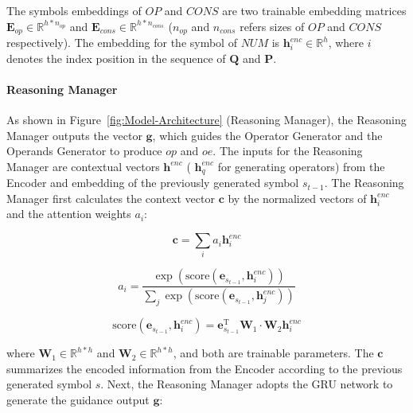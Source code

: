 \documentclass{article}
\begin{document}
The symbols embeddings of \(\textit{OP}\) and \(\textit{CONS}\) are two trainable embedding matrices \(\mathbf{E}_{op}\in \mathbb{R}^{h * n_{\textit{op}}}\) and \(\mathbf{E}_{\textit{cons}} \in \mathbb{R}^{h * n_{\textit{cons}}}\) (\(n_{\textit{op}}\) and \(n_{\textit{cons}}\) refers sizes of \(\textit{OP}\) and  \(\textit{CONS}\) respectively). The embedding for the symbol of \(\textit{NUM}\) is \(\mathbf{h}^{\textit{enc}}_{i} \in \mathbb{R}^{h}\), where \(i\) denotes the index position in the sequence of \(\textbf{Q}\) and \(\textbf{P}\).



\paragraph{Reasoning Manager}

As shown in Figure~\ref{fig:Model-Architecture} (Reasoning Manager), the Reasoning Manager outputs the vector \(\mathbf{g}\), which guides the Operator Generator and the Operands Generator to produce \(\textit{op}\) and \(\textit{oe}\). The inputs for the Reasoning Manager are contextual vectors \(\textbf{h}^{\textit{enc}}\) ( \(\textbf{h}^{\textit{enc}}_{q}\) for generating operators) from the Encoder and embedding of the previously generated symbol \(s_{t-1}\). The Reasoning Manager first calculates the context vector \(\mathbf{c}\) by the normalized vectors of \(\mathbf{h}^{enc}_{i}\) and the attention weights \(a_{i}\):






\begin{equation}
	\mathbf{c} = \sum_{i} a_{i} \mathbf{h}^{\textit{enc}}_{i}
\end{equation}

\begin{equation}
	a_{i} = \frac {\exp ( \text{score} (\mathbf{e}_{s_{t-1}} , \mathbf{h}^{\textit{enc}}_{i} ) )} 
    					  { \sum_{j} \exp ( \text{score} (\mathbf{e}_{s_{t-1}} , \mathbf{h}^{\textit{enc}}_{j}  ) )  }
\end{equation}

\begin{equation}
	\text{score} (\mathbf{e}_{s_{t-1}}, \mathbf{h}^{\textit{enc}}_{i} ) = 
	\mathbf{e}_{s_{t-1}}^\mathrm{T} \mathbf{W}_{1} \cdot
    \mathbf{W}_{2} \mathbf{h}^{\textit{enc}}_{i}
\end{equation}

where \(\mathbf{W}_{1} \in \mathbb{R}^{h*h}\) and \(\mathbf{W}_{2} \in \mathbb{R}^{h*h}\), and both are trainable parameters. The \(\mathbf{c}\) summarizes the encoded information from the Encoder according to the previous generated symbol \(s\). Next, the Reasoning Manager adopts the GRU \cite{GRU} network to generate the guidance output \(\mathbf{g}\):
\end{document}
